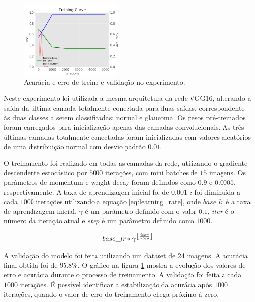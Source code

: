 \documentclass[conference]{IEEEtran}
\DeclarePairedDelimiter\floor{\lfloor}{\rfloor}
\begin{document}
  \begin{figure}[!tp]
    \centering
    \includegraphics[width=2in]{img/curve_vgg16.png}
    \caption{Acurácia e erro de treino e validação no experimento.}
    \label{fig:acuracia_vgg16_transfer}
  \end{figure}


  Neste experimento foi utilizada a mesma arquitetura da rede VGG16, alterando a saída da última camada totalmente conectada para duas saídas, correspondente às duas classes a serem classificadas: normal e glaucoma. Os pesos pré-treinados foram carregados para inicialização apenas das camadas convolucionais. As três últimas camadas totalmente conectadas foram inicializadas com valores aleatórios de uma distribuição normal com desvio padrão $0.01$. %
  
  O treinamento foi realizado em todas as camadas da rede, utilizando o gradiente descendente estocástico por $5000$ iterações, com mini batches de $15$ imagens. Os parâmetros de momentum e weight decay foram definidos como $0.9$ e $0.0005$, respectivamente. A taxa de aprendizagem inicial foi de $0.001$ e foi diminuída a cada $1000$ iterações utilizando a equação \ref{eq:learning_rate}, onde $base\_lr$ é a taxa de aprendizagem inicial, $\gamma$ é um parâmetro definido com o valor $0.1$, $iter$ é o número da iteração atual e $step$ é um parâmetro definido como $1000$.

  \begin{equation}
    base\_lr * \gamma^{\floor*{\frac{iter}{step}}}
    \label{eq:learning_rate}
  \end{equation}


  A validação do modelo foi feita utilizando um dataset de 24 imagens. A acurácia final obtida foi de $95.8\%$. O gráfico na figura \ref{fig:acuracia_vgg16_transfer} mostra a evolução dos valores de erro e acurácia durante o processo de treinamento. A validação foi feita a cada $1000$ iterações. É possível identificar a estabilização da acurácia após $1000$ iterações, quando o valor de erro do treinamento chega próximo à zero.
\end{document}
